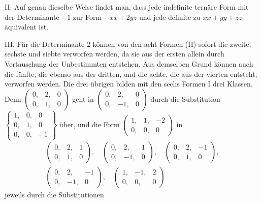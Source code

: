 II. Auf genau dieselbe Weise findet man, dass jede indefinite ternäre Form mit der Determinante \(-1\) zur Form \(-xx+2yz\) und jede definite zu \(xx+yy+zz\) äquivalent ist.

III. Für die Determinante \(2\) können von den acht Formen (II) sofort die zweite, sechste und siebte verworfen werden, da sie aus der ersten allein durch Vertauschung der Unbestimmten entstehen. Aus demselben Grund können auch die fünfte, die ebenso aus der dritten, und die achte, die aus der vierten entsteht, verworfen werden. Die drei übrigen bilden mit den sechs Formen I drei Klassen. Denn \(\left(\begin{smallmatrix}0,&2,&0\\0,&1,&0\end{smallmatrix}\right)\) geht in \(\left(\begin{smallmatrix}0,&2,&0\\0,&-1,&0\end{smallmatrix}\right)\) durch die Substitution \(\left\{\begin{smallmatrix}1,&0,&0\\0,&1,&0\\0,&0,&-1\end{smallmatrix}\right\}\) über, und die Form \(\left(\begin{smallmatrix}1,&1,&-2\\0,&0,&0\end{smallmatrix}\right)\) in
\[
\begin{gathered}
\left(\begin{smallmatrix}0,&2,&1\\0,&1,&0\end{smallmatrix}\right),\quad
\left(\begin{smallmatrix}0,&2,&1\\0,&-1,&0\end{smallmatrix}\right),\quad
\left(\begin{smallmatrix}0,&2,&-1\\0,&1,&0\end{smallmatrix}\right),\\
\left(\begin{smallmatrix}0,&2,&-1\\0,&-1,&0\end{smallmatrix}\right),\quad
\left(\begin{smallmatrix}1,&-1,&2\\0,&0,&0\end{smallmatrix}\right)
\end{gathered}
\]
jeweils durch die Substitutionen
